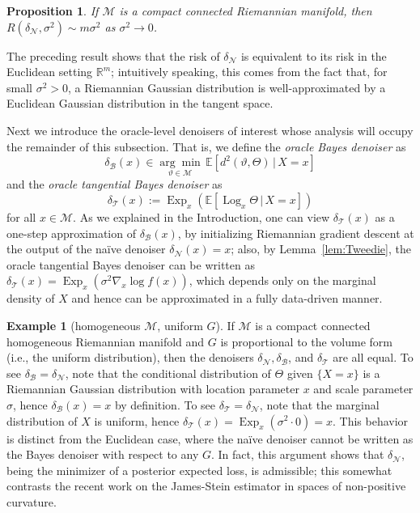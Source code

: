 \documentclass[preprint]{imsart}
\theoremstyle{plain}
\newtheorem{proposition}[theorem]{Proposition}
\theoremstyle{definition}
\newtheorem{example}[theorem]{Example}
\newcommand{\Rbb}{\mathbb{R}}
\newcommand{\Ebb}{\mathbb{E}}
\newcommand{\Mcal}{\mathcal{M}}
\newcommand{\B}{\mathcal{B}}
\newcommand{\N}{\mathcal{N}}
\newcommand{\T}{\mathcal{T}}
\DeclareMathOperator{\Log}{Log}
\DeclareMathOperator{\Exp}{Exp}
\begin{document}
\begin{proposition}\label{prop:naive-risk}
    If $\Mcal$ is a compact connected Riemannian manifold, then $R(\delta_{\N},\sigma^2) \sim m\sigma^2$ as $\sigma^2\to 0$.
\end{proposition}


The preceding result shows that the risk of $\delta_{\N}$ is equivalent to its risk in the Euclidean setting $\Rbb^m$; intuitively speaking, this comes from the fact that, for small $\sigma^2>0$, a Riemannian Gaussian distribution is well-approximated by a Euclidean Gaussian distribution in the tangent space.

Next we introduce the oracle-level denoisers of interest whose analysis will occupy the remainder of this subsection.
That is, we define the \textit{oracle Bayes denoiser} as
\begin{equation}\label{eqn:def-deltaB}
    \delta_{\B}(x)\in \underset{\vartheta\in\Mcal}{\arg\min}\,\Ebb[d^2(\vartheta,\Theta)\,|\,X=x]
\end{equation}
and the \textit{oracle tangential Bayes denoiser} as
\begin{equation}\label{eqn:def-deltaT}
    \delta_{\T}(x):=\Exp_x\left(\Ebb[\Log_x\Theta\,|\,X=x]\right)
\end{equation}
for all $x\in\Mcal$.
As we explained in the Introduction, one can view $\delta_{\T}(x)$ as a one-step approximation of $\delta_{\B}(x)$, by initializing Riemannian gradient descent at the output of the na\"ive denoiser $\delta_{\N}(x)= x$; also, by Lemma~\ref{lem:Tweedie}, the oracle tangential Bayes denoiser can be written as $\delta_{\T}(x) =\Exp_x(\sigma^2\nabla_x\log f(x))$, which depends only on the marginal density of $X$ and hence can be approximated in a fully data-driven manner.

\begin{example}[homogeneous $\Mcal$, uniform $G$]\label{ex:oracle-uniform}
    If $\Mcal$ is a compact connected homogeneous Riemannian manifold and $G$ is proportional to the volume form (i.e., the uniform distribution), then the denoisers $\delta_{\N},\delta_{\B}$, and $\delta_{\T}$ are all equal.
    To see $\delta_{\B} = \delta_{\N}$, note that the conditional distribution of $\Theta$ given $\{X=x\}$ is a Riemannian Gaussian distribution with location parameter $x$ and scale parameter $\sigma$, hence $\delta_{\B}(x) = x$ by definition.
    To see $\delta_{\T} = \delta_{\N}$, note that the marginal distribution of $X$ is uniform, hence $\delta_{\T}(x) = \Exp_x(\sigma^2\cdot 0) = x$.
    This behavior is distinct from the Euclidean case, where the na\"ive denoiser cannot be written as the Bayes denoiser with respect to any $G$.
    In fact, this argument shows that $\delta_{\N}$, being the minimizer of a posterior expected loss, is admissible; this somewhat contrasts the recent work \cite{SteinFrechet} on the James-Stein estimator in spaces of non-positive curvature.
\end{example}
\end{document}
